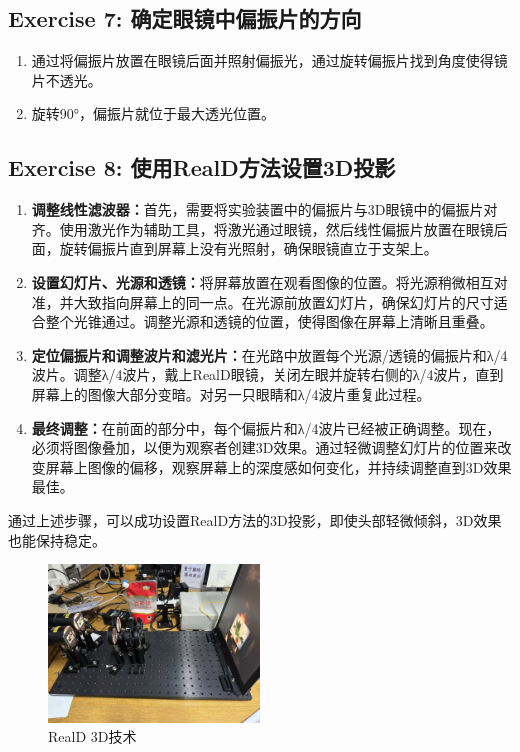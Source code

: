 \documentclass{ctexart}
\begin{document}
\subsection{Exercise 7: 确定眼镜中偏振片的方向}
\begin{enumerate}
    \item 通过将偏振片放置在眼镜后面并照射偏振光，通过旋转偏振片找到角度使得镜片不透光。
    \item 旋转90°，偏振片就位于最大透光位置。
\end{enumerate}

\subsection{Exercise 8: 使用RealD方法设置3D投影}
\begin{enumerate}
    \item \textbf{调整线性滤波器：}首先，需要将实验装置中的偏振片与3D眼镜中的偏振片对齐。使用激光作为辅助工具，将激光通过眼镜，然后线性偏振片放置在眼镜后面，旋转偏振片直到屏幕上没有光照射，确保眼镜直立于支架上。

    \item \textbf{设置幻灯片、光源和透镜：}将屏幕放置在观看图像的位置。将光源稍微相互对准，并大致指向屏幕上的同一点。在光源前放置幻灯片，确保幻灯片的尺寸适合整个光锥通过。调整光源和透镜的位置，使得图像在屏幕上清晰且重叠。

    \item \textbf{定位偏振片和调整波片和滤光片：}在光路中放置每个光源/透镜的偏振片和λ/4波片。调整λ/4波片，戴上RealD眼镜，关闭左眼并旋转右侧的λ/4波片，直到屏幕上的图像大部分变暗。对另一只眼睛和λ/4波片重复此过程。

    \item \textbf{最终调整：}在前面的部分中，每个偏振片和λ/4波片已经被正确调整。现在，必须将图像叠加，以便为观察者创建3D效果。通过轻微调整幻灯片的位置来改变屏幕上图像的偏移，观察屏幕上的深度感如何变化，并持续调整直到3D效果最佳。
\end{enumerate}

通过上述步骤，可以成功设置RealD方法的3D投影，即使头部轻微倾斜，3D效果也能保持稳定。
\begin{figure}[H]
    \centering
    \includegraphics[width=0.5\textwidth]{pictures/微信图片_20241212140323.jpg}
    \caption{RealD 3D技术}
\end{figure}
\end{document}

